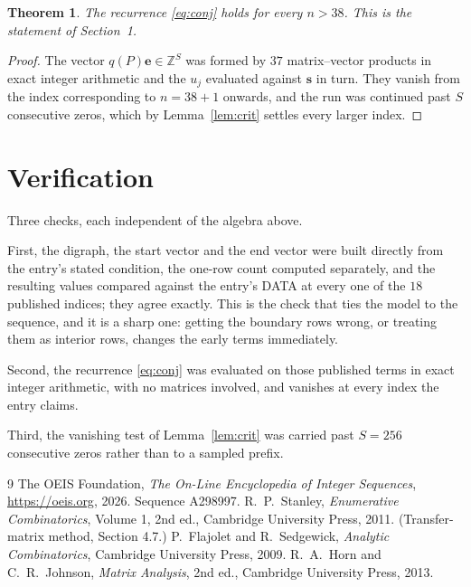 \documentclass[11pt,a4paper]{article}
\theoremstyle{plain}
\newtheorem{theorem}{Theorem}
\theoremstyle{definition}
\begin{document}
\begin{theorem}
The recurrence \eqref{eq:conj} holds for every $n>38$. This is the statement of
Section~1.
\end{theorem}

\begin{proof}
The vector $q(P)\mathbf{e}\in\mathbb{Z}^{S}$ was formed by $37$ matrix--vector
products in exact integer arithmetic and the $u_j$ evaluated against $\mathbf{s}$ in turn.
They vanish from the index corresponding to $n=38+1$ onwards, and the run was continued
past $S$ consecutive zeros, which by Lemma~\ref{lem:crit} settles every larger index.
\end{proof}

\section{Verification}

Three checks, each independent of the algebra above.

First, the digraph, the start vector and the end vector were built directly from the
entry's stated condition, the one-row count computed separately, and the resulting values
compared against the entry's DATA at every one of the $18$ published indices; they
agree exactly. This is the check that ties the model to the sequence, and it is a sharp one:
getting the boundary rows wrong, or treating them as interior rows, changes the early terms
immediately.

Second, the recurrence \eqref{eq:conj} was evaluated on those published terms in exact
integer arithmetic, with no matrices involved, and vanishes at every index the entry claims.

Third, the vanishing test of Lemma~\ref{lem:crit} was carried past $S=256$ consecutive
zeros rather than to a sampled prefix.

\begin{thebibliography}{9}
 The OEIS Foundation, \emph{The On-Line Encyclopedia of Integer
Sequences}, \url{https://oeis.org}, 2026. Sequence A298997.
 R.~P.~Stanley, \emph{Enumerative Combinatorics}, Volume 1, 2nd ed.,
Cambridge University Press, 2011. (Transfer-matrix method, Section 4.7.)
 P.~Flajolet and R.~Sedgewick, \emph{Analytic Combinatorics}, Cambridge
University Press, 2009.
 R.~A.~Horn and C.~R.~Johnson, \emph{Matrix Analysis}, 2nd ed., Cambridge
University Press, 2013.
\end{thebibliography}
\end{document}

